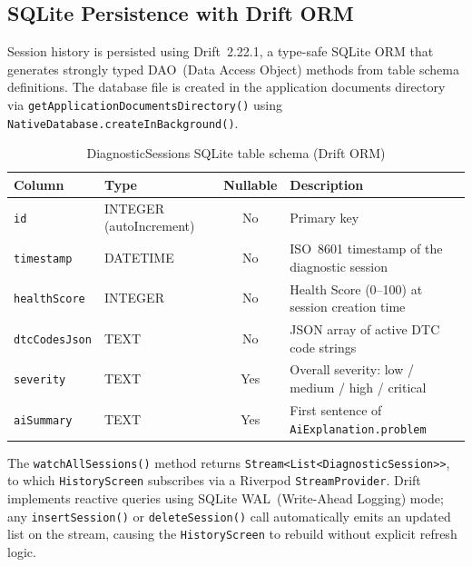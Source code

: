 \subsection{SQLite Persistence with Drift ORM}

Session history is persisted using Drift~2.22.1, a type-safe SQLite ORM that generates strongly typed DAO~(Data Access Object) methods from table schema definitions.
The database file is created in the application documents directory via \texttt{getApplicationDocumentsDirectory()} using \texttt{NativeDatabase.createInBackground()}.

\begin{table}[!htbp]
\centering
\caption{DiagnosticSessions SQLite table schema (Drift ORM)}
\label{tab:schema}
\begin{tabularx}{0.95\linewidth}{p{2.8cm} p{3.4cm} c X}
\toprule
\rowcolor{tblhdr}
\color{white}\textbf{Column} &
\color{white}\textbf{Type} &
\color{white}\textbf{Nullable} &
\color{white}\textbf{Description} \\
\midrule
\texttt{id}           & INTEGER (autoIncrement) & No  & Primary key \\
\texttt{timestamp}    & DATETIME                & No  & ISO~8601 timestamp of the diagnostic session \\
\texttt{healthScore}  & INTEGER                 & No  & Health Score (0--100) at session creation time \\
\texttt{dtcCodesJson} & TEXT                    & No  & JSON array of active DTC code strings \\
\texttt{severity}     & TEXT                    & Yes & Overall severity: low / medium / high / critical \\
\texttt{aiSummary}    & TEXT                    & Yes & First sentence of \texttt{AiExplanation.problem} \\
\bottomrule
\end{tabularx}
\end{table}

The \texttt{watchAllSessions()} method returns \texttt{Stream<List<DiagnosticSession>>}, to which \texttt{HistoryScreen} subscribes via a Riverpod \texttt{StreamProvider}.
Drift implements reactive queries using SQLite WAL~(Write-Ahead Logging) mode; any \texttt{insertSession()} or \texttt{deleteSession()} call automatically emits an updated list on the stream, causing the \texttt{HistoryScreen} to rebuild without explicit refresh logic.

